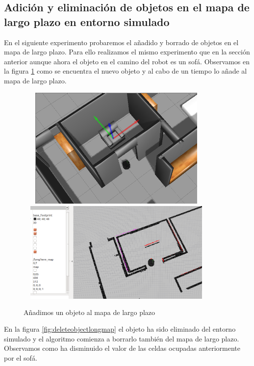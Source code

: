 \subsection {Adición y eliminación de objetos en el mapa de largo plazo en entorno simulado}
\label{sec:add-deleteobjectslong}
En el siguiente experimento probaremos el añadido y borrado de objetos en el mapa de largo plazo. Para ello realizamos el mismo experimento que en la sección anterior aunque ahora el objeto en el camino del robot es un sofá. Observamos en la figura \ref{fig:addobjectlongmap} como se encuentra el nuevo objeto y al cabo de un tiempo lo añade al mapa de largo plazo. 
\begin{figure}[hbtp]
  \begin{center}
    \includegraphics[width=10cm,height=6cm]{img/cap7/addingobject-gazebo}
    \includegraphics[width=10cm,height=5cm]{img/cap7/addingobject-longmap}
  \end{center}
  \caption{Añadimos un objeto al mapa de largo plazo}
  \label{fig:addobjectlongmap}
\end{figure}
En la figura \ref{fig:deleteobjectlongmap} el objeto ha sido eliminado del entorno simulado y el algoritmo comienza a borrarlo también del mapa de largo plazo. Observamos como ha disminuido el valor de las celdas ocupadas anteriormente por el sofá.

